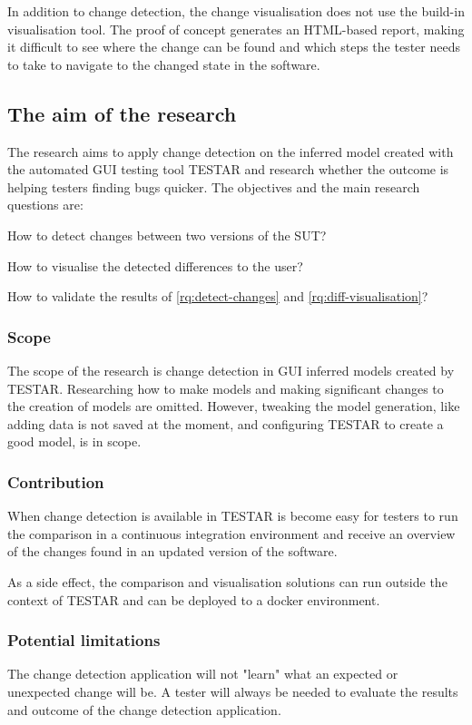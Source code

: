 In addition to change detection, the change visualisation does not use the build-in visualisation tool. The proof of concept generates an HTML-based report, making it difficult to see where the change can be found and which steps the tester needs to take to navigate to the changed state in the software.

\subsection{The aim of the research}
The research aims to apply change detection on the inferred model created with the automated GUI testing tool TESTAR and research whether the outcome is helping testers finding bugs quicker. The objectives and the main research questions are:

\begin{questions}
    \item How to detect changes between two versions of the SUT?
	\item How to visualise the detected differences to the user? 
\item How to validate the results of \ref{rq:detect-changes} and \ref{rq:diff-visualisation}?
\end{questions}

\subsubsection{Scope}
The scope of the research is change detection in GUI inferred models created by TESTAR. Researching how to make models and making significant changes to the creation of models are omitted. However, tweaking the model generation, like adding data is not saved at the moment, and configuring TESTAR to create a good model, is in scope.

\subsubsection{Contribution}
When change detection is available in TESTAR is become easy for testers to run the comparison in a continuous integration environment and receive an overview of the changes found in an updated version of the software.

As a side effect, the comparison and visualisation solutions can run outside the context of TESTAR and can be deployed to a docker environment.

\subsubsection{Potential limitations}
The change detection application will not "learn" what an expected or unexpected change will be. A tester will always be needed to evaluate the results and outcome of the change detection application.

